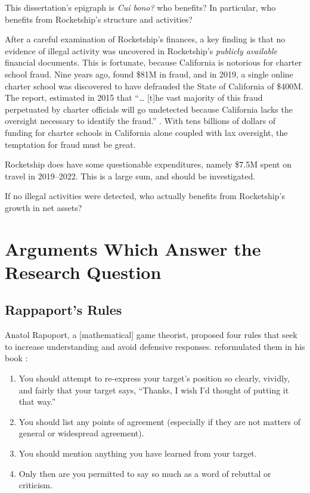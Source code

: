 This dissertation's epigraph is \textit{Cui bono?} who benefits? In particular, who benefits from Rocketship's structure and activities?

After a careful examination of Rocketship's finances, a key finding is that no evidence of illegal activity was uncovered in Rocketship's \textit{publicly available} financial documents. This is fortunate, because California is notorious for charter school fraud. Nine years ago, \textcite{CPD2015} found \$81M in fraud, and in 2019, a single online charter school was discovered to have defrauded the State of California of \$400M. The report,  estimated in 2015 that ``\ldots{} [t]he vast majority of this fraud perpetuated by charter officials will go undetected because California lacks the oversight necessary to identify the fraud.'' \parencite[2]{CPD2015}. With tens billions of dollars of funding for charter schools in California alone coupled with lax oversight, the temptation for fraud must be great. 

Rocketship does have some questionable expenditures, namely \$7.5M spent on travel in 2019–2022. This is a large sum, and should be investigated.

If no illegal activities were detected,  who actually benefits from Rocketship's growth in net assets?

\section{Arguments Which Answer the Research Question}%
\label{sec:appr-answ-rese-quest}\indent%

\subsection{Rappaport's Rules}%
\label{sec:rappaports-rules}\indent%

Anatol Rapoport, a [mathematical] game theorist, proposed four rules that seek to increase understanding and avoid defensive responses.  reformulated them in his book  \parencite{Dennett2013}:
\begin{enumerate}[topsep=0.3\baselineskip,itemsep=0.25\baselineskip]
  \item You should attempt to re-express your target’s position so clearly, vividly, and fairly that your target says, “Thanks, I wish I’d thought of putting it that way.”
  \item You should list any points of agreement (especially if they are not matters of general or widespread agreement).
  \item You should mention anything you have learned from your target.
  \item Only then are you permitted to say so much as a word of rebuttal or criticism.
\end{enumerate}
\medskip


